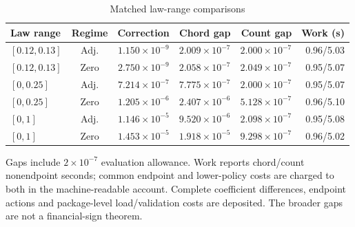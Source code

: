 \begin{table}[tbp]
\centering
\caption{Matched law-range comparisons}\label{tab:r12_broader}
\begin{tabular}{lcrrrr}
\toprule
Law range & Regime & Correction & Chord gap & Count gap & Work (s) \\
\midrule
$[0.12,0.13]$ & Adj. & $1.150\times10^{-9}$ & $2.009\times10^{-7}$ & $2.000\times10^{-7}$ & 0.96/5.03 \\
$[0.12,0.13]$ & Zero & $2.750\times10^{-9}$ & $2.058\times10^{-7}$ & $2.049\times10^{-7}$ & 0.95/5.07 \\
$[0,0.25]$ & Adj. & $7.214\times10^{-7}$ & $7.775\times10^{-7}$ & $2.000\times10^{-7}$ & 0.95/5.07 \\
$[0,0.25]$ & Zero & $1.205\times10^{-6}$ & $2.407\times10^{-6}$ & $5.128\times10^{-7}$ & 0.96/5.10 \\
$[0,1]$ & Adj. & $1.146\times10^{-5}$ & $9.520\times10^{-6}$ & $2.098\times10^{-7}$ & 0.95/5.08 \\
$[0,1]$ & Zero & $1.453\times10^{-5}$ & $1.918\times10^{-5}$ & $9.298\times10^{-7}$ & 0.96/5.02 \\
\bottomrule
\end{tabular}
\par\smallskip
{\footnotesize Gaps include $2\times10^{-7}$ evaluation allowance. Work reports chord/count nonendpoint seconds; common endpoint and lower-policy costs are charged to both in the machine-readable account. Complete coefficient differences, endpoint actions and package-level load/validation costs are deposited. The broader gaps are not a financial-sign theorem.}
\end{table}
